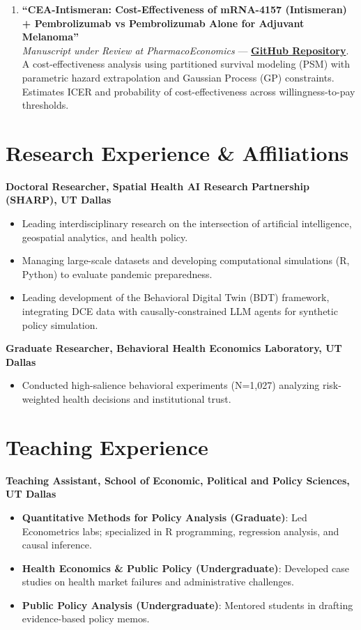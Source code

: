 \documentclass[11pt, letterpaper]{article}
\begin{document}
\begin{enumerate}
    \item \textbf{``CEA-Intismeran: Cost-Effectiveness of mRNA-4157 (Intismeran) + Pembrolizumab vs Pembrolizumab Alone for Adjuvant Melanoma''} \\
    \textit{Manuscript under Review at PharmacoEconomics} --- \href{https://github.com/yichao2022/cea-intismeran}{\textbf{GitHub Repository}}. A cost-effectiveness analysis using partitioned survival modeling (PSM) with parametric hazard extrapolation and Gaussian Process (GP) constraints. Estimates ICER and probability of cost-effectiveness across willingness-to-pay thresholds.
\end{enumerate}

\section*{Research Experience \& Affiliations}
\textbf{Doctoral Researcher, Spatial Health AI Research Partnership (SHARP), UT Dallas} \\
\begin{itemize}[noitemsep, topsep=0pt, label={-}]
    \item Leading interdisciplinary research on the intersection of artificial intelligence, geospatial analytics, and health policy.
    \item Managing large-scale datasets and developing computational simulations (R, Python) to evaluate pandemic preparedness.
    \item Leading development of the Behavioral Digital Twin (BDT) framework, integrating DCE data with causally-constrained LLM agents for synthetic policy simulation.
\end{itemize}

\vspace{0.5em}
\noindent \textbf{Graduate Researcher, Behavioral Health Economics Laboratory, UT Dallas} \\
\begin{itemize}[noitemsep, topsep=0pt, label={-}]
    \item Conducted high-salience behavioral experiments (N=1,027) analyzing risk-weighted health decisions and institutional trust.
\end{itemize}

\section*{Teaching Experience}
\textbf{Teaching Assistant, School of Economic, Political and Policy Sciences, UT Dallas}
\begin{itemize}[noitemsep, topsep=0pt]
    \item \textbf{Quantitative Methods for Policy Analysis (Graduate)}: Led Econometrics labs; specialized in R programming, regression analysis, and causal inference.
    \item \textbf{Health Economics \& Public Policy (Undergraduate)}: Developed case studies on health market failures and administrative challenges.
    \item \textbf{Public Policy Analysis (Undergraduate)}: Mentored students in drafting evidence-based policy memos.
\end{itemize}
\end{document}
